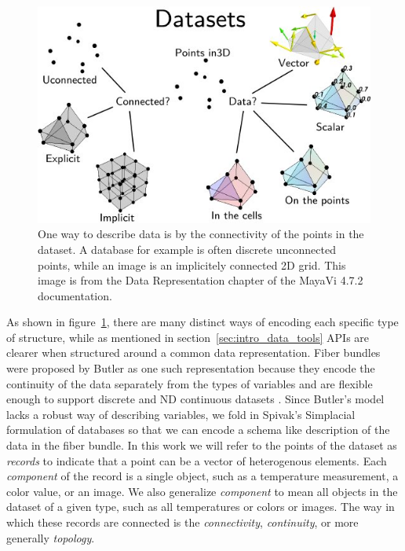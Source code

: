 \documentclass[../main.tex]{subfiles}
\begin{document}
\begin{figure}[H]
    \includegraphics[width=1\textwidth]{figures/intro/dataset_diagram.png}
    \caption{One way to describe data is by the connectivity of the points in the dataset. A database for example is often discrete unconnected points, while an image is an implicitely connected 2D grid. This image is from the Data Representation chapter of the MayaVi 4.7.2 documentation.\cite{DataRepresentationMayavi}}
    \label{fig:intro_data_format}
\end{figure}
As shown in figure~\ref{fig:intro_data_format}, there are many distinct ways of encoding each specific type of structure, while as mentioned in section~\ref{sec:intro_data_tools} APIs are clearer when structured around a common data representation. Fiber bundles were proposed by Butler as one such representation because they encode the continuity of the data separately from the types of variables and are flexible enough to support discrete and ND continuous datasets \cite{butlerVisualizationModelBased1989,butlerVectorBundleClassesForm1992}. Since Butler's model lacks a robust way of describing variables, we fold in Spivak's Simplacial formulation of databases \cite{spivakDatabasesAreCategories2010,spivakSIMPLICIALDATABASES} so that we can encode a schema like description of the data in the fiber bundle. In this work we will refer to the points of the dataset as \textit{records} to indicate that a point can be a vector of heterogenous elements. Each \textit{component} of the record is a single object, such as a temperature measurement, a color value, or an image. We also generalize \textit{component} to mean all objects in the dataset of a given type, such as all temperatures or colors or images. The way in which these records are connected is the \textit{connectivity}, \textit{continuity}, or more generally \textit{topology}.
\end{document}
